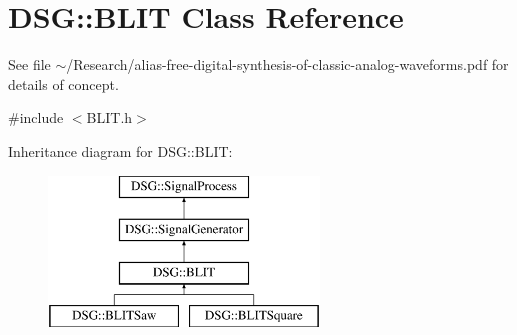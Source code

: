 \hypertarget{classDSG_1_1BLIT}{\section{D\+S\+G\+:\+:B\+L\+I\+T Class Reference}
\label{classDSG_1_1BLIT}
}


See file $\sim$/\+Research/alias-\/free-\/digital-\/synthesis-\/of-\/classic-\/analog-\/waveforms.pdf for details of concept.  




{\ttfamily \#include $<$B\+L\+I\+T.\+h$>$}

Inheritance diagram for D\+S\+G\+:\+:B\+L\+I\+T\+:\begin{figure}[H]
\begin{center}
\leavevmode
\includegraphics[height=4.000000cm]{classDSG_1_1BLIT}
\end{center}
\end{figure}
